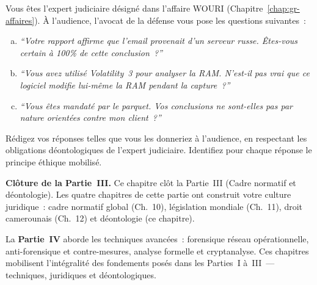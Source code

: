 \begin{boxexo}[title={\ding{45}\quad Exercice~13.3 --- Simulation décision éthique \niveauexpert}]
Vous êtes l'expert judiciaire désigné dans l'affaire WOURI
(Chapitre~\ref{chap:gr-affaires}). À l'audience, l'avocat de la défense
vous pose les questions suivantes~:
\begin{enumerate}[(a)]
    \item \textit{``Votre rapport affirme que l'email provenait d'un
          serveur russe. Êtes-vous certain à 100\% de cette conclusion~?''}
    \item \textit{``Vous avez utilisé Volatility~3 pour analyser la RAM.
          N'est-il pas vrai que ce logiciel modifie lui-même la RAM
          pendant la capture~?''}
    \item \textit{``Vous êtes mandaté par le parquet. Vos conclusions
          ne sont-elles pas par nature orientées contre mon client~?''}
\end{enumerate}
Rédigez vos réponses telles que vous les donneriez à l'audience, en
respectant les obligations déontologiques de l'expert judiciaire.
Identifiez pour chaque réponse le principe éthique mobilisé.
\end{boxexo}

\bigskip

\begin{boxinfo}
\textbf{Clôture de la Partie~III.} Ce chapitre clôt la Partie~III
(Cadre normatif et déontologie). Les quatre chapitres de cette partie
ont construit votre culture juridique~: cadre normatif global (Ch.~10),
législation mondiale (Ch.~11), droit camerounais (Ch.~12) et déontologie
(ce chapitre).

La \textbf{Partie~IV} aborde les techniques avancées~: forensique
réseau opérationnelle, anti-forensique et contre-mesures, analyse
formelle et cryptanalyse. Ces chapitres mobilisent l'intégralité
des fondements posés dans les Parties~I à~III~--- techniques,
juridiques et déontologiques.
\end{boxinfo}
